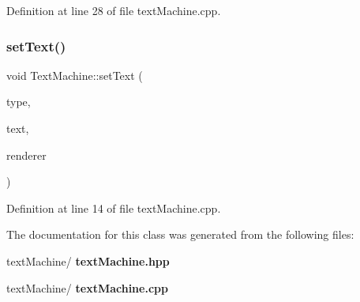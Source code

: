 Definition at line 28 of file text\+Machine.\+cpp.

\mbox{\label{class_text_machine_a0f1f656364927e648a08985a8f2f5056}} 
\subsubsection{set\+Text()}
{\footnotesize\ttfamily void Text\+Machine\+::set\+Text (\begin{DoxyParamCaption}\item[{\textbf{ mv\+::constants\+::text\+Types\+::\+T\+Y\+PE}}]{type,  }\item[{const std\+::string \&}]{text,  }\item[{S\+D\+L\+\_\+\+Renderer $\ast$}]{renderer }\end{DoxyParamCaption})}



Definition at line 14 of file text\+Machine.\+cpp.



The documentation for this class was generated from the following files\+:\begin{DoxyCompactItemize}
\item 
text\+Machine/\textbf{ text\+Machine.\+hpp}\item 
text\+Machine/\textbf{ text\+Machine.\+cpp}\end{DoxyCompactItemize}

